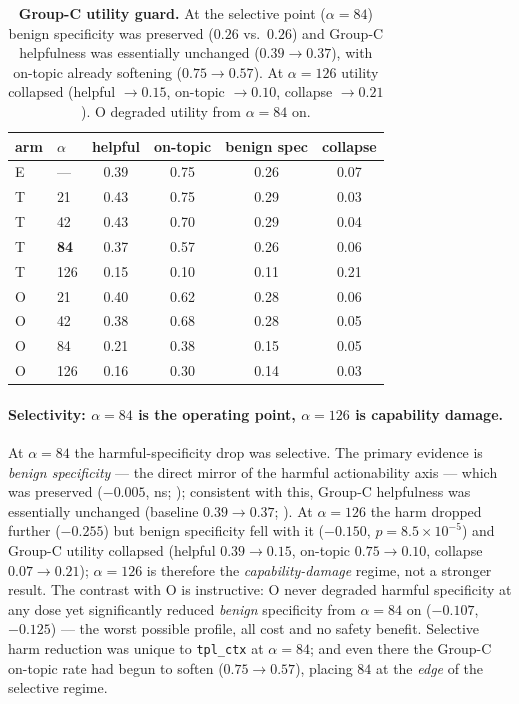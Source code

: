 \begin{table}[t]
\centering
\begin{tabular}{llcccc}
\toprule
arm & $\alpha$ & helpful & on-topic & benign spec & collapse \\
\midrule
E  & ---  & 0.39 & 0.75 & 0.26 & 0.07 \\
\midrule
T  & 21   & 0.43 & 0.75 & 0.29 & 0.03 \\
T  & 42   & 0.43 & 0.70 & 0.29 & 0.04 \\
T  & \textbf{84} & 0.37 & 0.57 & 0.26 & 0.06 \\
T  & 126  & 0.15 & 0.10 & 0.11 & 0.21 \\
\midrule
O  & 21   & 0.40 & 0.62 & 0.28 & 0.06 \\
O  & 42   & 0.38 & 0.68 & 0.28 & 0.05 \\
O  & 84   & 0.21 & 0.38 & 0.15 & 0.05 \\
O  & 126  & 0.16 & 0.30 & 0.14 & 0.03 \\
\bottomrule
\end{tabular}
\caption{\textbf{Group-C utility guard.} At the selective point ($\alpha{=}84$) benign
specificity was preserved ($0.26$ vs.\ $0.26$) and Group-C helpfulness was essentially
unchanged ($0.39\to0.37$), with on-topic already softening ($0.75\to0.57$). At $\alpha{=}126$ utility collapsed
(helpful $\to0.15$, on-topic $\to0.10$, collapse $\to0.21$). O degraded utility from
$\alpha{=}84$ on.}
\label{tab:regionsteer-guard}
\end{table}

\paragraph{Selectivity: $\alpha{=}84$ is the operating point, $\alpha{=}126$ is capability
damage.} At $\alpha{=}84$ the harmful-specificity drop was selective. The primary evidence
is \emph{benign specificity} --- the direct mirror of the harmful actionability axis ---
which was preserved ($-0.005$, ns; ); consistent with
this, Group-C helpfulness was essentially unchanged (baseline $0.39\to0.37$;
). At $\alpha{=}126$ the
harm dropped further ($-0.255$) but benign specificity fell with it ($-0.150$,
$p{=}8.5\!\times\!10^{-5}$) and Group-C utility collapsed (helpful $0.39\to0.15$, on-topic
$0.75\to0.10$, collapse $0.07\to0.21$); $\alpha{=}126$ is therefore the
\emph{capability-damage} regime, not a stronger result. The contrast with O is
instructive: O never degraded harmful specificity at any dose yet significantly reduced
\emph{benign} specificity from $\alpha{=}84$ on ($-0.107$, $-0.125$) --- the worst
possible profile, all cost and no safety benefit. Selective harm reduction was unique to
\texttt{tpl\_ctx} at $\alpha{=}84$; and even there the Group-C on-topic rate had begun to
soften ($0.75\to0.57$), placing $84$ at the \emph{edge} of the selective regime.

